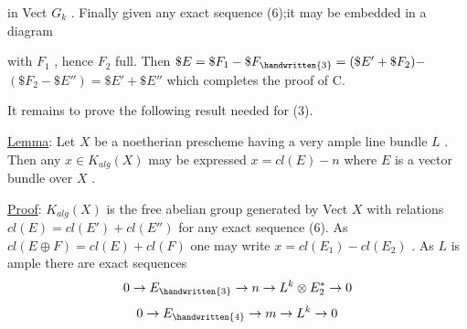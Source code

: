 
in Vect $G_k$ . Finally given any exact sequence (6);it may be
embedded in a diagram


with $F_1$ , hence $F_2$ full. Then $\$E = \$F_1 - \$F_{\handwritten{3}} = (\$E' + \$F_2) -$
$(\$F_2 - \$E'') = \$E' + \$E''$ which completes the proof of C.

It remains to prove the following result needed for (3).

\uline{Lemma}: Let $X$ be a noetherian prescheme having a very
ample line bundle $L$ . Then any $x \in K_{alg}(X)$ may be expressed
$x = cl(E) - n$ where $E$ is a vector bundle over $X$ .

\uline{Proof}: $K_{alg}(X)$ is the free abelian group generated by Vect $X$
with relations $cl(E) = cl(E') + cl(E'')$ for any exact sequence (6).
As $cl(E \oplus F) = cl(E) + cl(F)$ one may write $x = cl(E_1) - cl(E_2)$ .
As $L$ is ample there are exact sequences
\[ 0 \to E_{\handwritten{3}} \to n \to L^k \otimes E_2^* \to 0 \]
\[ 0 \to E_{\handwritten{4}} \to m \to L^k \to 0 \]

